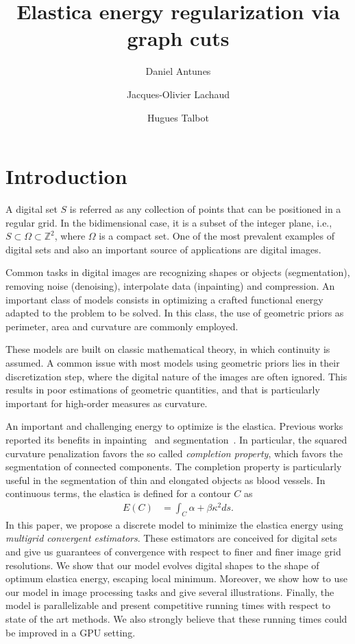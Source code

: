 \documentclass[smallextended]{svjour3}
\begin{document}
%
\title{Elastica energy regularization via graph cuts}
\author{Daniel Antunes%
\and Jacques-Olivier Lachaud %
\and Hugues Talbot}%

\maketitle

\section{Introduction}

A digital set $S$ is referred as any collection of points that can be positioned in a regular grid. In the bidimensional case, it is a subset of the integer plane, i.e., $S \subset \Omega \subset \mathbb{Z}^2$, where $\Omega$ is a compact set. One of the most prevalent examples of digital sets and also an important source of applications are digital images.

Common tasks in digital images are recognizing shapes or objects (segmentation), removing noise (denoising), interpolate data (inpainting) and compression. An important class of models consists in optimizing a crafted functional energy adapted to the problem to be solved. In this class, the use of geometric priors as perimeter, area and curvature are commonly employed.

These models are built on classic mathematical theory, in which continuity is assumed. A common issue with most models using geometric priors lies in their discretization step, where the digital nature of the images are often ignored. This results in poor estimations of geometric quantities, and that is particularly important for high-order measures as curvature.

An important and challenging energy to optimize is the elastica. Previous works reported its benefits in inpainting~\cite{masnou98inpainting,ballester01filljoint,chan02elasticainpainting} and segmentation~\cite{goldluecke11totalcurvature,zhu2013image,nieuwenhuis14efficient, antunes20}. In particular, the squared curvature penalization favors the so called \emph{completion property}, which favors the segmentation of connected components. The completion property is particularly useful in the segmentation of thin and elongated objects as blood vessels. In continuous terms, the elastica is defined for a contour $C$ as
%
\begin{align*}
	E(C) &= \int_{C}{\alpha + \beta \kappa^2 ds}.
\end{align*}
%
In this paper, we propose a discrete model to minimize the elastica energy using \emph{multigrid convergent estimators}. These estimators are conceived for digital sets and give us guarantees of convergence with respect to finer and finer image grid resolutions. We show that our model evolves digital shapes to the shape of optimum elastica energy, escaping local minimum. Moreover, we show how to use our model in image processing tasks and give several illustrations. Finally, the model is parallelizable and present competitive running times with respect to state of the art methods. We also strongly believe that these running times could be improved in a GPU setting.
%
%
\end{document}
